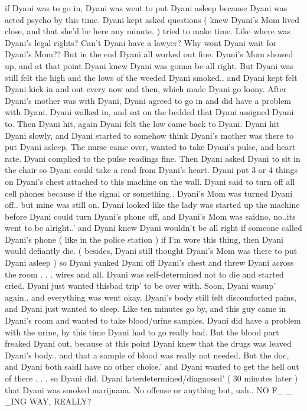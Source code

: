 \documentclass[12pt]{book}
\begin{document}
if Dyani was to go in, Dyani was went to put Dyani asleep because Dyani was acted psycho by this time. Dyani kept asked questions ( knew Dyani's Mom lived close, and that she'd be here any minute. ) tried to make time. Like where was Dyani's legal rights? Can't Dyani have a lawyer? Why wont Dyani wait for Dyani's Mom?? But in the end Dyani all worked out fine. Dyani's Mom showed up, and at that point Dyani knew Dyani was gonna be all right. But Dyani was still felt the high and the lows of the weeded Dyani smoked.. and Dyani kept felt Dyani kick in and out every now and then, which made Dyani go loony. After Dyani's mother was with Dyani, Dyani agreed to go in and did have a problem with Dyani. Dyani walked in, and sat on the bedded that Dyani assigned Dyani to. Then Dyani hit, again Dyani felt the low came back to Dyani. Dyani hit Dyani slowly, and Dyani started to somehow think Dyani's mother was there to put Dyani asleep. The nurse came over, wanted to take Dyani's pulse, and heart rate. Dyani complied to the pulse readings fine. Then Dyani asked Dyani to sit in the chair so Dyani could take a read from Dyani's heart. Dyani put 3 or 4 things on Dyani's chest attached to this machine on the wall. Dyani said to turn off all cell phones because if the signal or something.. Dyani's Mom was turned Dyani off.. but mine was still on. Dyani looked like the lady was started up the machine before Dyani could turn Dyani's phone off, and Dyani's Mom was saidno, no..its went to be alright..' and Dyani knew Dyani wouldn't be all right if someone called Dyani's phone ( like in the police station ) if I'm wore this thing, then Dyani would defiantly die. ( besides, Dyani still thought Dyani's Mom was there to put Dyani asleep ) so Dyani yanked Dyani off Dyani's chest and threw Dyani across the room  . . .  wires and all. Dyani was self-determined not to die and started cried. Dyani just wanted thisbad trip' to be over with. Soon, Dyani wasup' again.. and everything was went okay. Dyani's body still felt discomforted pains, and Dyani just wanted to sleep. Like ten minutes go by, and this guy came in Dyani's room and wanted to take blood/urine samples. Dyani did have a problem with the urine, by this time Dyani had to go really bad. But the blood part freaked Dyani out, because at this point Dyani knew that the drugs was leaved Dyani's body.. and that a sample of blood was really not needed. But the doc, and Dyani both saidI have no other choice.' and Dyani wanted to get the hell out of there  . . .  so Dyani did. Dyani laterdetermined/diagnosed' ( 30 minutes later ) that Dyani was smoked marijuana. No offense or anything but, uah.. NO F\_ \_ \_ING WAY, REALLY?
\end{document}
